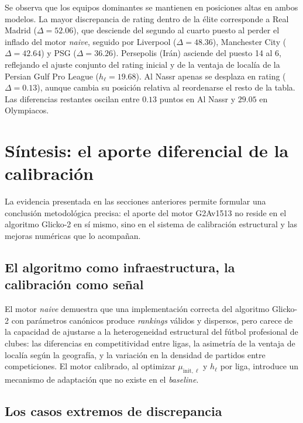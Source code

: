 Se observa que los equipos dominantes se mantienen en posiciones altas en ambos modelos. La mayor discrepancia de rating dentro de la \'elite corresponde a Real Madrid ($\Delta=52.06$), que desciende del segundo al cuarto puesto al perder el inflado del motor \textit{naive}, seguido por Liverpool ($\Delta=48.36$), Manchester City ($\Delta=42.64$) y PSG ($\Delta=36.26$). Persepolis (Ir\'an) asciende del puesto 14 al 6, reflejando el ajuste conjunto del rating inicial y de la ventaja de local\'ia de la Persian Gulf Pro League ($h_\ell=19.68$). Al Nassr apenas se desplaza en rating ($\Delta=0.13$), aunque cambia su posici\'on relativa al reordenarse el resto de la tabla. Las diferencias restantes oscilan entre $0{.}13$ puntos en Al Nassr y $29{.}05$ en Olympiacos.


\section{S\'intesis: el aporte diferencial de la calibraci\'on}

La evidencia presentada en las secciones anteriores permite formular una conclusi\'on metodol\'ogica precisa: el aporte del motor G2Av1513 no reside en el algoritmo Glicko-2 en s\'i mismo, sino en el sistema de calibraci\'on estructural y las mejoras num\'ericas que lo acompa\~nan.

\subsection{El algoritmo como infraestructura, la calibraci\'on como se\~nal}

El motor \textit{naive} demuestra que una implementaci\'on correcta del algoritmo Glicko-2 con par\'ametros can\'onicos produce \textit{rankings} v\'alidos y dispersos, pero carece de la capacidad de ajustarse a la heterogeneidad estructural del f\'utbol profesional de clubes: las diferencias en competitividad entre ligas, la asimetr\'ia de la ventaja de local\'ia seg\'un la geograf\'ia, y la variaci\'on en la densidad de partidos entre competiciones. El motor calibrado, al optimizar $\mu_{\text{init},\ell}$ y $h_\ell$ por liga, introduce un mecanismo de adaptaci\'on que no existe en el \textit{baseline}.

\subsection{Los casos extremos de discrepancia}

